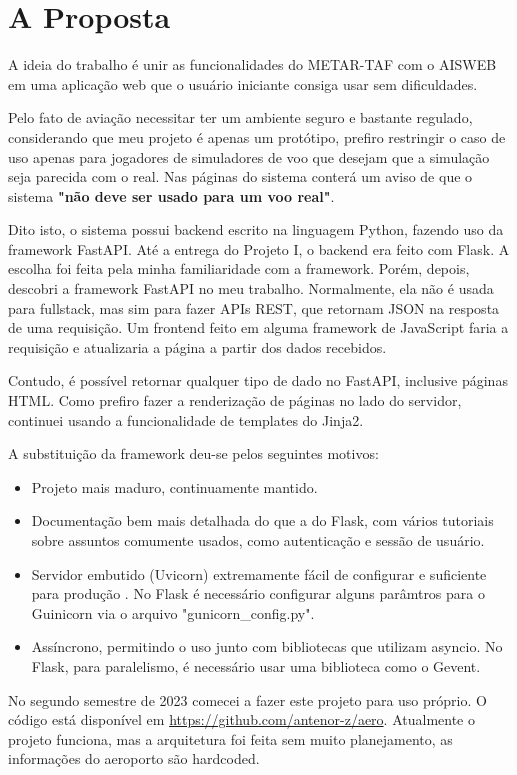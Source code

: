 \chapter{A Proposta}
A ideia do trabalho é unir as funcionalidades do METAR-TAF com o AISWEB
em uma aplicação web que o usuário iniciante consiga usar sem dificuldades.

Pelo fato de aviação necessitar ter um ambiente seguro e bastante regulado, considerando
que meu projeto é apenas um protótipo, prefiro restringir o caso de uso apenas
para jogadores de simuladores de voo que desejam que a simulação seja parecida
com o real. Nas páginas do sistema conterá um aviso de que o sistema \textbf{"não
deve ser usado para um voo real"}.

Dito isto, o sistema possui backend escrito na linguagem Python, fazendo uso da 
framework FastAPI. Até a entrega do Projeto I, o backend era feito com Flask. 
A escolha foi feita pela minha familiaridade com a framework. Porém, depois, 
descobri a framework FastAPI no meu trabalho. Normalmente, ela não é usada para fullstack, mas 
sim para fazer APIs REST, que retornam JSON na resposta de uma requisição. Um 
frontend feito em alguma framework de JavaScript faria a requisição e atualizaria a página
a partir dos dados recebidos.

Contudo, é possível retornar qualquer tipo de dado no FastAPI, inclusive páginas HTML. 
Como prefiro fazer a renderização de páginas no lado do servidor, continuei usando 
a funcionalidade de templates do Jinja2.

A substituição da framework deu-se pelos seguintes motivos:

\begin{itemize}
\item Projeto mais maduro, continuamente mantido.
\item Documentação bem mais detalhada do que a do Flask, com vários tutoriais sobre assuntos comumente usados, como autenticação e sessão de usuário.
\item Servidor embutido (Uvicorn) extremamente fácil de configurar e suficiente para produção \cite{fast-api-prod}.
No Flask é necessário configurar alguns parâmtros para o Guinicorn via o arquivo "gunicorn\_config.py".
\item Assíncrono, permitindo o uso junto com bibliotecas que utilizam asyncio.
No Flask, para paralelismo, é necessário usar uma biblioteca como o Gevent.
\end{itemize}

No segundo semestre de 2023 comecei a fazer este projeto para uso próprio.
O código está disponível em \url{https://github.com/antenor-z/aero}. Atualmente o
projeto funciona, mas a arquitetura foi feita sem muito planejamento, as
informações do aeroporto são hardcoded.

